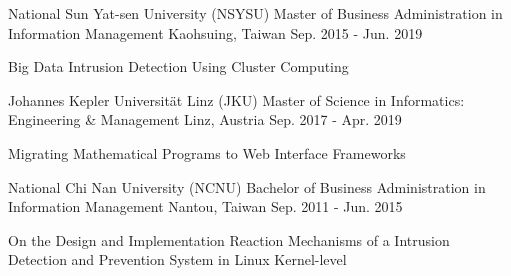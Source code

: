 


\begin{cventries}


\cventry
{National Sun Yat-sen University (NSYSU)} %
{Master of Business Administration in Information Management} %
{Kaohsuing, Taiwan} %
{Sep. 2015 - Jun. 2019} %
{ %
\begin{cvitems}
\item {Big Data Intrusion Detection Using Cluster Computing}
\end{cvitems}
}



\cventry
{Johannes Kepler Universität Linz (JKU)} %
{Master of Science in Informatics: Engineering \& Management} %
{Linz, Austria} %
{Sep. 2017 - Apr. 2019} %
{ %
\begin{cvitems}
\item {Migrating Mathematical Programs to Web Interface Frameworks}
\end{cvitems}
}



\cventry
{National Chi Nan University (NCNU)} %
{Bachelor of Business Administration in Information Management} %
{Nantou, Taiwan} %
{Sep. 2011 - Jun. 2015} %
{ %
\begin{cvitems}
\item {On the Design and Implementation Reaction Mechanisms of a Intrusion Detection and Prevention System in Linux Kernel-level}
\end{cvitems}
}


\end{cventries}